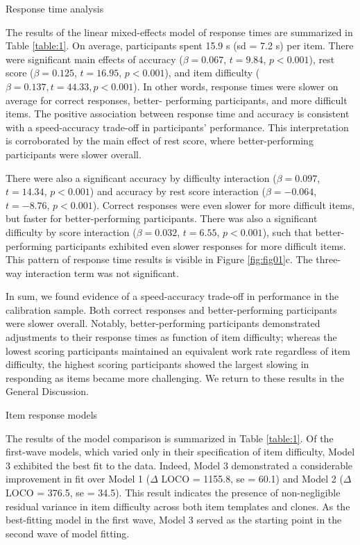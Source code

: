 \documentclass[a4paper,man,natbib]{apa6}
\makeatletter
\renewcommand{\subsubsection}{\@startsection{subsubsection}{3}
  {\z@}%
  {\b@level@two@skip}{\e@level@two@skip}%
  {\normalfont\normalsize\bfseries}}
\makeatother
\begin{document}
\subsubsection{Response time analysis}

The results of the linear mixed-effects model of response times are summarized in Table \ref{table:1}. On average, participants spent 15.9 s (sd = 7.2 s) per item. There were significant main effects of accuracy ($\beta = 0.067$, $t = 9.84$, $p < 0.001$), rest score ($\beta = 0.125$, $t = 16.95$, $p < 0.001$), and item difficulty ($\beta = 0.137, t = 44.33, p < 0.001$). In other words, response times were slower on average for correct responses, better- performing participants, and more difficult items. The positive association between response time and accuracy is consistent with a speed-accuracy trade-off in participants' performance. This interpretation is corroborated by the main effect of rest score, where better-performing participants were slower overall. 

There were also a significant accuracy by difficulty interaction ($\beta = 0.097$, $t = 14.34$, $p < 0.001$) and accuracy by rest score interaction ($\beta = -0.064$, $t = -8.76$, $p < 0.001$). Correct responses were even slower for more difficult items, but faster for better-performing participants. There was also a significant difficulty by score interaction ($\beta = 0.032$, $t = 6.55$, $p < 0.001$), such that better-performing participants exhibited even slower responses for more difficult items. This pattern of response time results is visible in Figure \ref{fig:fig01}c. The three-way interaction term was not significant. 

In sum, we found evidence of a speed-accuracy trade-off in performance in the calibration sample. Both correct responses and better-performing participants were slower overall. Notably, better-performing participants demonstrated adjustments to their response times as function of item difficulty; whereas the lowest scoring participants maintained an equivalent work rate regardless of item difficulty, the highest scoring participants showed the largest slowing in responding as items became more challenging. We return to these results in the General Discussion. 

\subsubsection{Item response models}

The results of the model comparison is summarized in Table \ref{table:1}. Of the first-wave models, which varied only in their specification of item difficulty, Model 3 exhibited the best fit to the data. Indeed, Model 3 demonstrated a considerable improvement in fit over Model 1 ($\Delta$ LOCO = 1155.8, se = 60.1) and Model 2 ($\Delta$ LOCO = 376.5, se = 34.5). This result indicates the presence of non-negligible residual variance in item difficulty across both item templates and clones. As the best-fitting model in the first wave, Model 3 served as the starting point in the second wave of model fitting.
\end{document}
